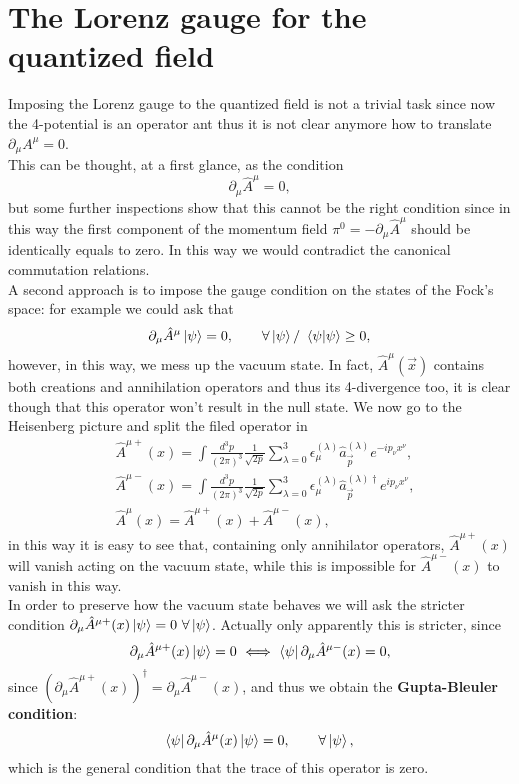 \section{The Lorenz gauge for the quantized field}
Imposing the Lorenz gauge to the quantized field is not a trivial task since now the 4-potential is an operator ant thus it is not clear anymore how to translate $\partial_\mu A^\mu=0$.\\
This can be thought, at a first glance, as the condition
\begin{equation*}
    \partial_\mu\hat{A}^\mu=0,
\end{equation*} 
but some further inspections show that this cannot be the right condition since in this way the first component of the momentum field $\pi^0=-\partial_\mu\hat{A}^\mu$ should be identically equals to zero. In this way we would contradict the canonical commutation relations.\\

A second approach is to impose the gauge condition on the states of the Fock's space: for example we could ask that
\begin{equation*}
    \partial_\mu\hat{A}^\mu\ket{\psi}=0,\qquad \forall\ket{\psi}/\ \braket{\psi|\psi}\geq0,
\end{equation*}
however, in this way, we mess up the vacuum state. In fact, $\hat{A}^\mu(\vec x)$ contains both creations and annihilation operators and thus its 4-divergence too, it is clear though that this operator won't result in the null state. We now go to the Heisenberg picture and split the filed operator in
\begin{align*}
  & \hat{A}^{\mu+}(x)=\int\frac{d^3p}{(2\pi)^3}\frac{1}{\sqrt{2p}}\sum_{\lambda=0}^{3}\epsilon_{\mu}^{(\lambda)}\hat{a}_{\vec p}^{(\lambda)}e^{-ip_\nu x^\nu},\\&  \hat{A}^{\mu-}(x)=\int\frac{d^3p}{(2\pi)^3}\frac{1}{\sqrt{2p}}\sum_{\lambda=0}^{3}\epsilon_{\mu}^{(\lambda)}\hat{a}_{\vec p}^{(\lambda)\dagger}e^{ip_\nu x^\nu},\\&  \hat{A}^{\mu}(x)=\hat{A}^{\mu+}(x)+ \hat{A}^{\mu-}(x),
\end{align*}
in this way it is easy to see that, containing only annihilator operators, $ \hat{A}^{\mu+}(x)$ will vanish acting on the vacuum state, while this is impossible for $ \hat{A}^{\mu-}(x)$ to vanish in this way.\\
In order to preserve how the vacuum state behaves we will ask the stricter condition $ \partial_\mu\hat{A}^{\mu+}(x)\ket{\psi}=0\ \forall \ket{\psi}$. Actually only apparently this is stricter, since  
\begin{equation*}
    \partial_\mu\hat{A}^{\mu+}(x)\ket{\psi}=0\ \Longleftrightarrow\  \bra{\psi}\partial_\mu\hat{A}^{\mu-}(x)=0,
\end{equation*}
since $(\partial_\mu\hat{A}^{\mu+}(x))^\dagger=\partial_\mu\hat{A}^{\mu-}(x)$, and thus we obtain the \textbf{Gupta-Bleuler condition}:
\begin{equation}
    \bra{\psi}\partial_\mu\hat{A}^{\mu}(x)\ket{\psi}=0,\qquad\forall\ket{\psi},\label{GuptaBleuerConditon}
\end{equation}
which is the general condition that the trace of this operator is zero.\\

